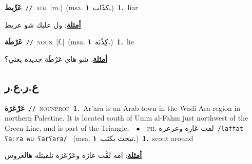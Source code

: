\documentclass[10pt,a4paper,twoside]{article} %
\begin{document}
\begin{multicols}{2}
{\setlength\topsep{0pt}\textbf{\foreignlanguage{arabic}{عَرِّيط}}\ {\color{gray}\texttt{//}\color{black}}\ \textsc{adj}\ [m.]\ \color{gray}(msa. \foreignlanguage{arabic}{كذّاب}~\foreignlanguage{arabic}{\textbf{١.}})\color{black}\ \textbf{1.}~liar\  \begin{flushright}\color{gray}\foreignlanguage{arabic}{\textbf{\underline{\foreignlanguage{arabic}{أمثلة}}}: ول عليك شو عريط}\end{flushright}\color{black}} \vspace{2mm}

{\setlength\topsep{0pt}\textbf{\foreignlanguage{arabic}{عَرْطَة}}\ {\color{gray}\texttt{//}\color{black}}\ \textsc{noun}\ [f.]\ \color{gray}(msa. \foreignlanguage{arabic}{كِذْبَة}~\foreignlanguage{arabic}{\textbf{١.}})\color{black}\ \textbf{1.}~lie\  \begin{flushright}\color{gray}\foreignlanguage{arabic}{\textbf{\underline{\foreignlanguage{arabic}{أمثلة}}}: شو هاي عَرْطَة جديدة يعني؟}\end{flushright}\color{black}} \vspace{2mm}

\vspace{-3mm}
\subsection*{\color{blue}\foreignlanguage{arabic}{ع.ر.ع.ر}\color{blue}{}} 

{\setlength\topsep{0pt}\textbf{\foreignlanguage{arabic}{عَرْعَرَة}}\ {\color{gray}\texttt{//}\color{black}}\ \textsc{noun\textunderscore prop}\ \textbf{1.}~Ar'ara is an Arab town in the Wadi Ara region in northern Palestine. It is located south of Umm al-Fahm just northwest of the Green Line, and is part of the Triangle.\ \ $\bullet$\ \ \textsc{ph.} \color{gray} \foreignlanguage{arabic}{لفت عَارة وعرعرة}\color{black}\ {\color{gray}\texttt{/{\sffamily laffat ʕaːra wu ʕarʕara}/}\color{black}}\ \color{gray} (msa. \foreignlanguage{arabic}{تبحث بكثب}~\foreignlanguage{arabic}{\textbf{١.}})\color{black}\ \textbf{1.}~scout around\  \begin{flushright}\color{gray}\foreignlanguage{arabic}{\textbf{\underline{\foreignlanguage{arabic}{أمثلة}}}: امه لفَّت عارَة وعَرْعَرَة تلقيتله هالعروس}\end{flushright}\color{black}} \vspace{2mm}


\end{multicols}
\end{document}

